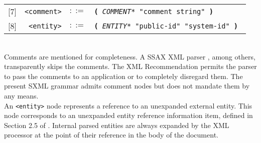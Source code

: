 \documentclass[10pt]{article}
\begin{document}
\begin{tabular}{rrcp{2.8in}}
{[}7{]} & \texttt{<comment>} &  $::=$ & \texttt{\textbf{(} {\itshape *COMMENT*} "comment string" \textbf{)} } \\
{[}8{]} & \texttt{<entity>} &  $::=$ & \texttt{\textbf{(} {\itshape *ENTITY*} "public-id" "system-id" \textbf{)} } \\
\end{tabular}
\\
Comments are mentioned for completeness. A SSAX XML parser
\cite{SSAX}, among others, transparently skips the comments.
The XML Recommendation permits the parser to pass the comments to
an application or to completely disregard them. The present SXML grammar
admits comment nodes but does not mandate them by any means.\\ An \texttt{<entity>} node represents a reference to an
unexpanded external entity. This node corresponds to an unexpanded
entity reference information item, defined in Section 2.5 of \cite{XML Infoset}. Internal parsed entities are always expanded by the
XML processor at the point of their reference in the body of the
document.
\end{document}
